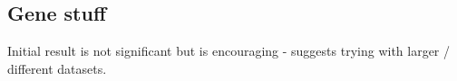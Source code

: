 \documentclass[12pt]{article} %
\begin{document}
	\subsection{Gene stuff}
	Initial result is not significant but is encouraging - suggests trying with larger / different datasets.
	
	
%
\end{document}
